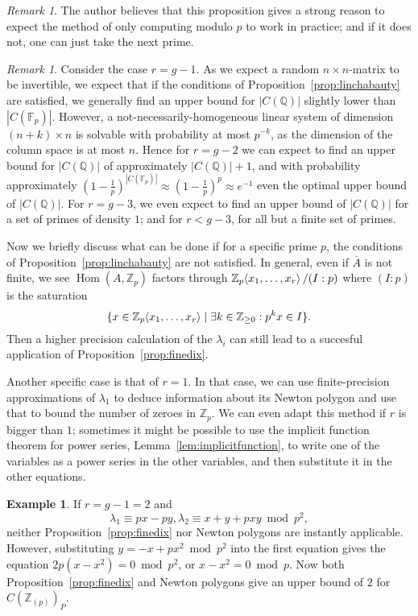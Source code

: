 \documentclass[12pt]{article}
\newcommand{\Z}{\mathbb{Z}}
\newcommand{\Q}{\mathbb{Q}}
\newcommand{\F}{\mathbb{F}}
\renewcommand{\angle}[1]{\hspace{-2pt}\left\langle #1 \right\rangle}
\DeclareMathOperator{\Hom}{Hom}
\theoremstyle{plain}
\theoremstyle{definition}
\newtheorem{exmp}[thm]{Example} %
\theoremstyle{remark}
\newtheorem{rem}[thm]{Remark} %
\begin{document}
\begin{rem}
The author believes that this proposition gives a strong reason to expect the method of only computing modulo $p$ to work in practice; and if it does not, one can just take the next prime.
\end{rem}
\begin{rem}
\label{rem:probwork}
Consider the case $r=g-1$. As we expect a random $n\times n$-matrix to be invertible, we expect that if the conditions of Proposition~\ref{prop:linchabauty} are satisfied, we generally find an upper bound for $|C(\Q)|$ slightly lower than $|C(\F_p)|$. However, a not-necessarily-homogeneous linear system of dimension $(n+k)\times n$ is solvable with probability at most $p^{-k}$, as the dimension of the column space is at most $n$. Hence for $r = g-2$ we can expect to find an upper bound for $|C(\Q)|$ of approximately $|C(\Q)|+1$, and with probability approximately $(1-\frac{1}{p})^{|C(\F_p)|} \approx (1-\frac{1}{p})^p \approx e^{-1}$ even the optimal upper bound of $|C(\Q)|$. For $r = g-3$, we even expect to find an upper bound of $|C(\Q)|$ for a set of primes of density $1$; and for $r < g-3$, for all but a finite set of primes. 
\end{rem}

Now we briefly discuss what can be done if for a specific prime $p$, the conditions of Proposition~\ref{prop:linchabauty} are not satisfied. In general, even if $\overline{A}$ is not finite, we see $\Hom(A,\Z_p)$ factors through $\Z_p\angle{x_1,\dots,x_r}/(I:p)$ where $(I:p)$ is the saturation \[\{x \in \Z_p\angle{x_1,\dots,x_r} \mid \exists k \in \Z_{\geq 0}: p^kx \in I\}.\]
Then a higher precision calculation of the $\lambda_i$ can still lead to a succesful application of Proposition~\ref{prop:finedix}.

Another specific case is that of $r = 1$. In that case, we can use finite-precision approximations of $\lambda_1$ to deduce information about its Newton polygon and use that to bound the number of zeroes in $\Z_p$. We can even adapt this method if $r$ is bigger than $1$; sometimes it might be possible to use the implicit function theorem for power series, Lemma~\ref{lem:implicitfunction}, to write one of the variables as a power series in the other variables, and then substitute it in the other equations.

\begin{exmp}
If $r = g-1 = 2$ and \[\lambda_1 \equiv px-py,\lambda_2 \equiv x+y+pxy \bmod p^2,\] neither Proposition~\ref{prop:finedix} nor Newton polygons are instantly applicable. However, substituting $y = -x +px^2 \bmod p^2$ into the first equation gives the equation $2p(x-x^2) = 0 \bmod p^2$, or $x-x^2 = 0\bmod p$. Now both Proposition~\ref{prop:finedix} and Newton polygons give an upper bound of $2$ for $C(\Z_{(p)})_P$.
\end{exmp}
\end{document}
